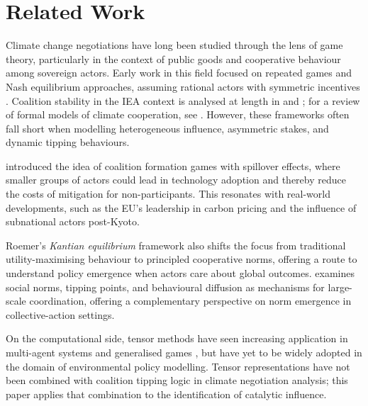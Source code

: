\documentclass[11pt]{article}
\begin{document}
\section{Related Work}
\label{sec:related}

Climate change negotiations have long been studied through the lens of game theory, particularly in the context of public goods and cooperative behaviour among sovereign actors. Early work in this field focused on repeated games and Nash equilibrium approaches, assuming rational actors with symmetric incentives \citep{barrett1994self, carraro1993strategies, nordhaus2015climate, weischer2012climate}. Coalition stability in the IEA context is analysed at length in \citet{barrett2003environment} and \citet{finus2001game}; for a review of formal models of climate cooperation, see \citet{hovi2014hope}. However, these frameworks often fall short when modelling heterogeneous influence, asymmetric stakes, and dynamic tipping behaviours.

\citet{tavoni2009coalitions} introduced the idea of coalition formation games with spillover effects, where smaller groups of actors could lead in technology adoption and thereby reduce the costs of mitigation for non-participants. This resonates with real-world developments, such as the EU’s leadership in carbon pricing and the influence of subnational actors post-Kyoto.

Roemer’s \textit{Kantian equilibrium} framework \citep{roemer2010kantian} also shifts the focus from traditional utility-maximising behaviour to principled cooperative norms, offering a route to understand policy emergence when actors care about global outcomes. \citet{young2015individual} examines social norms, tipping points, and behavioural diffusion as mechanisms for large-scale coordination, offering a complementary perspective on norm emergence in collective-action settings.

On the computational side, tensor methods have seen increasing application in multi-agent systems and generalised games \citep{kolda2009tensor}, but have yet to be widely adopted in the domain of environmental policy modelling. Tensor representations have not been combined with coalition tipping logic in climate negotiation analysis; this paper applies that combination to the identification of catalytic influence.
\end{document}
